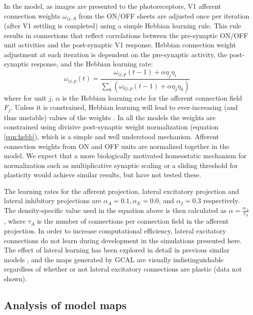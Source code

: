 \documentclass{article}
\begin{document}
In the model, as images are presented to the photoreceptors, V1
afferent connection weights $\omega_{ij,A}$ from the ON/OFF sheets are
adjusted once per iteration (after V1 settling is completed) using a
simple Hebbian learning rule. This rule results in connections that
reflect correlations between the pre-synaptic ON/OFF unit activities
and the post-synaptic V1 response.  Hebbian connection weight
adjustment at each iteration is dependent on the pre-synaptic
activity, the post-synaptic response, and the Hebbian learning rate:
\begin{equation}
\omega_{ij,p}(t)=\frac{\omega_{ij,p}(t-1)+\alpha\eta_{j}\eta_{i}}{\sum_{k}\left(\omega_{kj,p}(t-1)+\alpha\eta_{j}\eta_{k}\right)}
\label{eqn:hebb}
\end{equation}
where for unit $j$, $\alpha$ is the Hebbian learning rate for the
afferent connection field $F_{j}$. Unless it is constrained, Hebbian
learning will lead to ever-increasing (and thus unstable) values of
the weights \citep{Rochester1956}. In all the models the weights are
constrained using divisive post-synaptic weight normalization
(equation \ref{eqn:hebb}), which is a simple and well understood
mechanism. Afferent connection weights from ON and OFF units are
normalized together in the model. We expect that a more
biologically motivated
homeostatic mechanism for normalization such as multiplicative
synaptic scaling \citep{Turrigiano1999,Turrigiano2004,Sullivan2006}
or a sliding threshold for plasticity \citep{Bienenstock1982}
would achieve similar results, but have not tested these.

The learning rates for the afferent projection, lateral excitatory
projection and lateral inhibitory projections are
$\alpha_{A}=0.1,\alpha_{E}=0.0$, and $\alpha_{I}=0.3$ respectively.
The density-specific value used in the equation above is then
calculated as $\alpha=\frac{\alpha_{A}}{\tau_{A}}$, where $\tau_{A}$
is the number of connections per connection field in the afferent
projection. In order to increase computational efficiency, lateral
excitatory connections do not learn during development in the
simulations presented here. The effect of lateral learning has been
explored in detail in previous similar models \citep{Miikkulainen2005},
and the maps generated by GCAL are visually
indistinguishable regardless of whether or not lateral excitatory
connections are plastic (data not shown).

\subsection*{Analysis of model maps}
\end{document}
